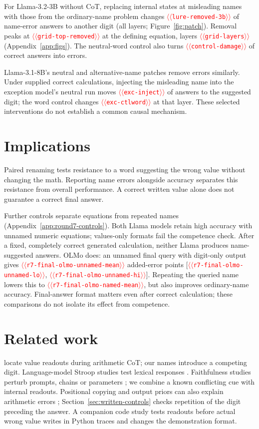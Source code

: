 \documentclass[11pt]{article}
\providecommand{\NUM}[1]{\textcolor{red}{$\langle\langle$\texttt{#1}$\rangle\rangle$}}
\begin{document}
For Llama-3.2-3B without CoT, replacing internal states at misleading names with those
from the ordinary-name problem changes \NUM{lure-removed-3b} of name-error answers
to another digit (all layers; Figure~\ref{fig:patch}).
Removal peaks at \NUM{grid-top-removed} at the defining equation, layers
\NUM{grid-layers} (Appendix~\ref{app:figs}). The neutral-word control also turns \NUM{control-damage} of correct
answers into errors.

Llama-3.1-8B's neutral and alternative-name patches remove errors similarly.
Under supplied correct calculations, injecting the misleading name into the exception
model's neutral run moves \NUM{exc-inject} of answers to the suggested digit; the word
control changes \NUM{exc-ctlword} at that layer. These selected interventions do not
establish a common causal mechanism.



\section{Implications}

Paired renaming tests resistance to a word suggesting the wrong value without changing
the math. Reporting name errors alongside accuracy separates this resistance from overall
performance. A correct written value alone does not guarantee a correct final answer.

Further controls separate equations from repeated names (Appendix~\ref{app:round7-controls}).
Both Llama models retain high accuracy with unnamed numeric equations; values-only formats
fail the competence check. After a fixed, completely correct generated calculation,
neither Llama produces name-suggested answers. OLMo does: an unnamed final query with
digit-only output gives \NUM{r7-final-olmo-unnamed-mean} added-error points
[\NUM{r7-final-olmo-unnamed-lo}, \NUM{r7-final-olmo-unnamed-hi}]. Repeating the queried name lowers this
to \NUM{r7-final-olmo-named-mean}, but also improves ordinary-name accuracy. Final-answer format
matters even after correct calculation; these comparisons do not isolate its effect from competence.

\section{Related work}

\citet{kudo2026faithful} locate value readouts during arithmetic CoT; our names introduce
a competing digit. Language-model Stroop studies test lexical responses
\cite{wang2026stroop,hu2026conflict}. Faithfulness studies perturb prompts, chains or
parameters \cite{turpin2023unfaithful,lanham2023measuring,chen2025reasoning,tutek2025unlearning};
we combine a known conflicting cue with internal readouts. Positional copying and output priors
can also explain arithmetic errors \cite{liu2026readout,prabhakar2024deciphering};
Section~\ref{sec:written-controls} checks repetition of the digit preceding the answer.
A companion code study \citep{anon2026code} tests readouts before actual wrong value writes
in Python traces and changes the demonstration format.
\end{document}
